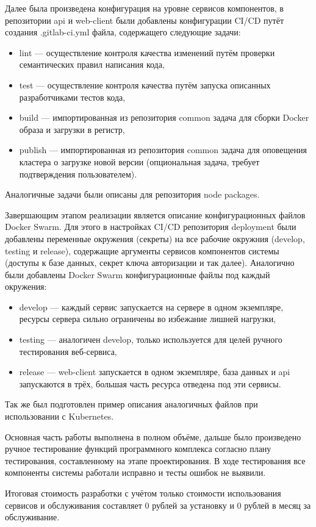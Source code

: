 Далее была произведена конфигурация на уровне сервисов компонентов, в репозитории api и web-client были добавлены конфигурации CI/CD путёт создания .gitlab-ci.yml файла, содержащего следующие задачи:
\begin{itemize}
    \item lint --- осуществление контроля качества изменений путём проверки семантических правил написания кода,
    \item test --- осуществление контроля качества путём запуска описанных разработчиками тестов кода,
    \item build --- импортированная из репозитория common задача для сборки Docker образа и загрузки в регистр,
    \item publish --- импортированная из репозитория common задача для оповещения кластера о загрузке новой версии (опциональная задача, требует подтверждения пользователем).
\end{itemize}

Аналогичные задачи были описаны для репозитория node packages.

Завершающим этапом реализации является описание конфигурационных файлов Docker Swarm.
Для этого в настройках CI/CD репозитория deployment были добавлены переменные окружения (секреты) на все рабочие окружния (develop, testing и release),
содержащие аргументы сервисов компонентов системы (доступы к базе данных, секрет ключа авторизации и так далее).
Аналогично были добавлены Docker Swarm конфигурационные файлы под каждый окружения:

\begin{itemize}
    \item develop --- каждый сервис запускается на сервере в одном экземпляре, ресурсы сервера сильно ограничены во избежание лишней нагрузки,
    \item testing --- аналогичен develop, только используется для целей ручного тестирования веб-сервиса,
    \item release --- web-client запускается в одном экземпляре, база данных и api запускаются в трёх, большая часть ресурса отведена под эти сервисы.
\end{itemize}

Так же был подготовлен пример описания аналогичных файлов при использовании с Kubernetes.

Основная часть работы выполнена в полном объёме, дальше было произведено ручное тестирование функций программного комплекса согласно плану тестирования, составленному на этапе проектирования.
В ходе тестирования все компоненты системы работали исправно и тесты ошибок не выявили.

Итоговая стоимость разработки с учётом только стоимости использования сервисов и обслуживания составляет 0 рублей за установку и 0 рублей в месяц за обслуживание.









